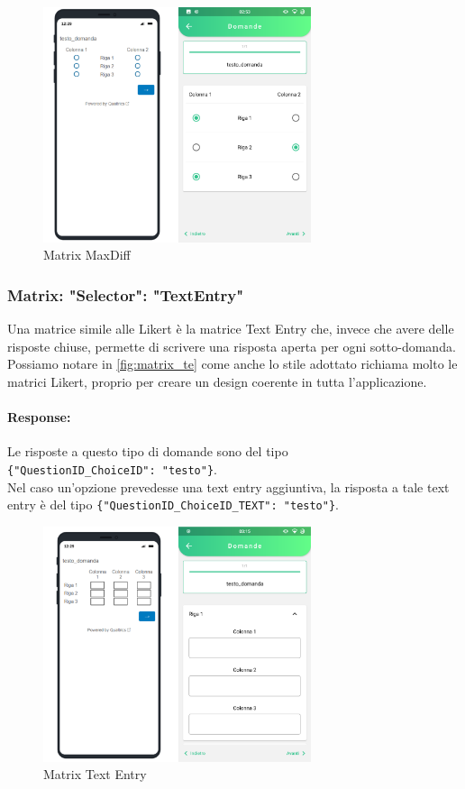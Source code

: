 \begin{figure}[h!]
\centering
\includegraphics[width=0.7\textwidth]{img/matrix_maxdiff}
\caption{Matrix MaxDiff}
\label{fig:matrix_maxdiff}
\end{figure}

\clearpage
\subsubsection{Matrix: "Selector": "TextEntry"}
Una matrice simile alle Likert è la matrice Text Entry che, invece che avere delle risposte chiuse, permette di scrivere una risposta aperta per ogni sotto-domanda. Possiamo notare in \autoref{fig:matrix_te} come anche lo stile adottato richiama molto le matrici Likert, proprio per creare un design coerente in tutta l'applicazione.

\paragraph{Response:}
Le risposte a questo tipo di domande sono del tipo\\ \texttt{\{"QuestionID\_ChoiceID": "testo"\}}.\\Nel caso un'opzione prevedesse una text entry aggiuntiva, la risposta a tale text entry è del tipo \texttt{\{"QuestionID\_ChoiceID\_TEXT": "testo"\}}.

\begin{figure}[h!]
\centering
\includegraphics[width=0.7\textwidth]{img/matrix_te}
\caption{Matrix Text Entry}
\label{fig:matrix_te}
\end{figure}

